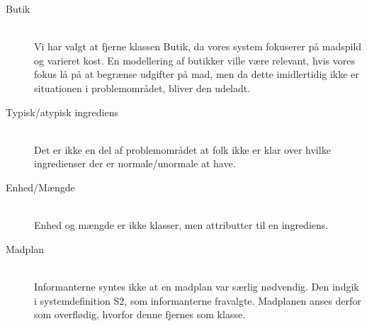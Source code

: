 \begin{description}
\item[Butik] \hfill \\
Vi har valgt at fjerne klassen Butik, da vores system fokuserer på madspild og varieret kost. En modellering af butikker ville være relevant, hvis vores fokus lå på at begrænse udgifter på mad, men da dette imidlertidig ikke er situationen i problemområdet, bliver den udeladt.

\item[Typisk/atypisk ingrediens] \hfill \\
Det er ikke en del af problemområdet at folk ikke er klar over hvilke ingredienser der er normale/unormale at have.

\item[Enhed/Mængde] \hfill \\
Enhed og mængde er ikke klasser, men attributter til en ingrediens.

\item[Madplan] \hfill \\
Informanterne syntes ikke at en madplan var særlig nødvendig. Den indgik i systemdefinition S2, som informanterne fravalgte. Madplanen anses derfor som overflødig, hvorfor denne fjernes som klasse.
\end{description}
